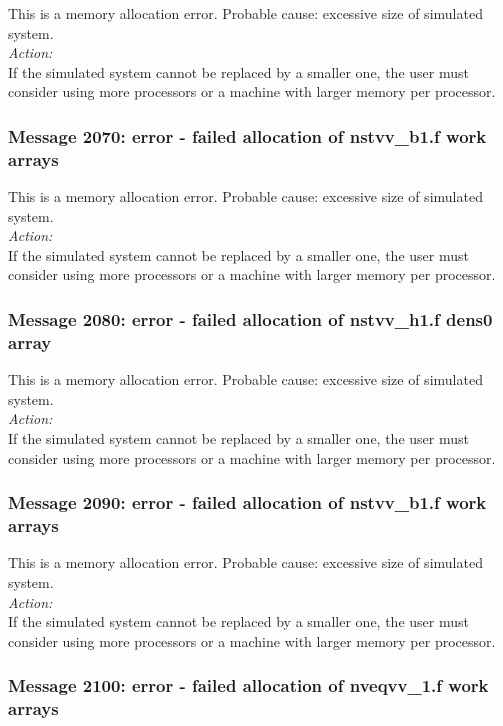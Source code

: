 This is a memory allocation error. Probable cause: excessive size of
simulated system. \\

\noindent
{\em Action:}\\
If the simulated system cannot be replaced by a smaller one, the user
must consider using more processors or a machine with larger memory
per processor.

\subsubsection*{Message 2070: error - failed allocation of nstvv\_b1.f
work arrays}

This is a memory allocation error. Probable cause: excessive size of
simulated system. \\

\noindent
{\em Action:}\\
If the simulated system cannot be replaced by a smaller one, the user
must consider using more processors or a machine with larger memory
per processor.

\subsubsection*{Message 2080: error - failed allocation of nstvv\_h1.f
dens0 array}

This is a memory allocation error. Probable cause: excessive size of
simulated system. \\

\noindent
{\em Action:}\\
If the simulated system cannot be replaced by a smaller one, the user
must consider using more processors or a machine with larger memory
per processor.

\subsubsection*{Message 2090: error - failed allocation of nstvv\_b1.f
work arrays}

This is a memory allocation error. Probable cause: excessive size of
simulated system. \\

\noindent
{\em Action:}\\
If the simulated system cannot be replaced by a smaller one, the user
must consider using more processors or a machine with larger memory
per processor.

\subsubsection*{Message 2100: error - failed allocation of nveqvv\_1.f
work arrays}

